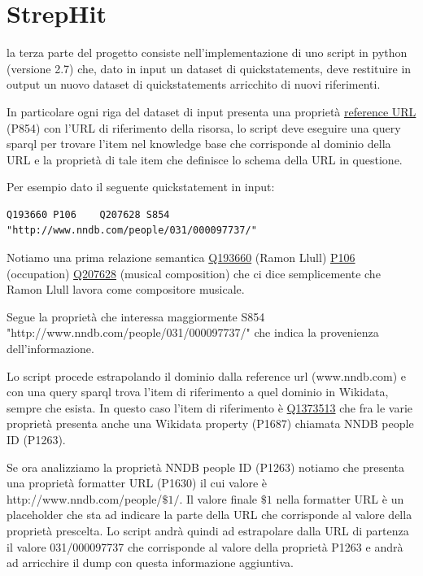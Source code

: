 \chapter{StrepHit}
\label{cha:strephit}
la terza parte del progetto consiste nell'implementazione di uno script in python (versione 2.7) che, dato in input un dataset di quickstatements, deve restituire in output un nuovo dataset
di quickstatements arricchito di nuovi riferimenti.

In particolare ogni riga del dataset di input presenta una proprietà \href{https://www.wikidata.org/wiki/Property:P854}{reference URL} (P854) con l'URL di riferimento della risorsa, lo 
script deve eseguire una query sparql per trovare l'item nel knowledge base che corrisponde al dominio della URL e la proprietà di tale item che definisce lo schema della URL in questione.

Per esempio dato il seguente quickstatement in input:
\begin{lstlisting}[style=QuickstatementsStyle]
    Q193660	P106	Q207628	S854	"http://www.nndb.com/people/031/000097737/"
\end{lstlisting}

Notiamo una prima relazione semantica 
\href{https://www.wikidata.org/wiki/Q193660}{Q193660} (Ramon Llull) \href{https://www.wikidata.org/wiki/Property:P106}{P106} (occupation) \href{https://www.wikidata.org/wiki/Q207628}{Q207628} (musical composition) 
che ci dice semplicemente che Ramon Llull lavora come compositore musicale.

Segue la proprietà che interessa maggiormente S854 "http://www.nndb.com/people/031/000097737/" che indica la provenienza dell'informazione. 

Lo script procede estrapolando il dominio dalla reference url (www.nndb.com) e con una query sparql trova l'item di riferimento a quel dominio in Wikidata, sempre che esista.
In questo caso l'item di riferimento è \href{https://www.wikidata.org/wiki/Q1373513}{Q1373513} che fra le varie proprietà presenta anche una Wikidata property (P1687) chiamata  
NNDB people ID (P1263).

Se ora analizziamo la proprietà NNDB people ID (P1263) notiamo che presenta una proprietà formatter URL (P1630) il cui valore è http://www.nndb.com/people/$\$1/$. 
Il valore finale $\$1$ nella formatter URL è un placeholder che sta ad indicare la parte della URL che corrisponde al valore della proprietà prescelta. 
Lo script andrà quindi ad estrapolare dalla URL di partenza il valore 031/000097737 che corrisponde al valore della proprietà P1263 e andrà ad arricchire il dump 
con questa informazione aggiuntiva.


